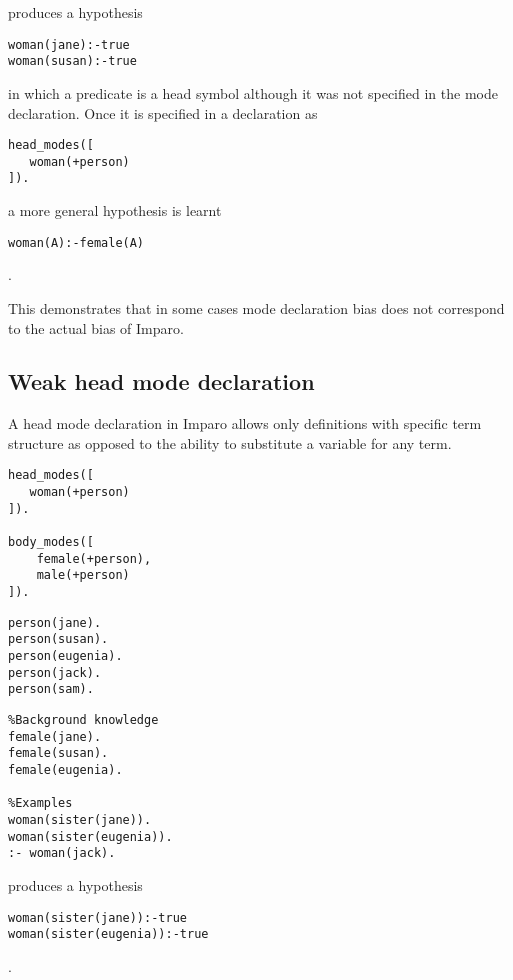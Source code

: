 produces a hypothesis 
\begin{lstlisting}
woman(jane):-true
woman(susan):-true
\end{lstlisting}

in which a predicate  is a head symbol although it was not specified in the mode declaration. Once it is specified in a declaration as
\begin{lstlisting}    
head_modes([
   woman(+person)
]).
\end{lstlisting}

a more general hypothesis is learnt

\begin{lstlisting}
woman(A):-female(A)
\end{lstlisting}.

This demonstrates that in some cases mode declaration bias does not correspond to the actual bias of Imparo.

\subsection{Weak head mode declaration}
A head mode declaration in Imparo allows only definitions with specific term structure as opposed to the ability to substitute a variable for any term.

\begin{minipage}[t]{.30\textwidth}
\begin{lstlisting}
head_modes([
   woman(+person)
]).

body_modes([
    female(+person),
    male(+person)
]).
\end{lstlisting}
\end{minipage}
\begin{minipage}[t]{.25\textwidth}
\begin{lstlisting}
person(jane).
person(susan).
person(eugenia).
person(jack).
person(sam).
\end{lstlisting}
\end{minipage}
\begin{minipage}[t]{.30\textwidth}
\begin{lstlisting}
%Background knowledge
female(jane).
female(susan).
female(eugenia).

%Examples
woman(sister(jane)).
woman(sister(eugenia)).
:- woman(jack).
\end{lstlisting}
\end{minipage}

produces a hypothesis 
\begin{lstlisting}
woman(sister(jane)):-true
woman(sister(eugenia)):-true
\end{lstlisting}.

